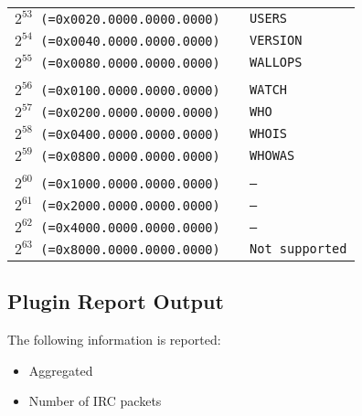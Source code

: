 \documentclass[documentation]{subfiles}
\begin{document}
\begin{minipage}{.48\textwidth}
\begin{longtable}{>{\tt}r>{\tt}l}
        $2^{53}$ (=0x0020.0000.0000.0000) & USERS        \\
        $2^{54}$ (=0x0040.0000.0000.0000) & VERSION      \\
        $2^{55}$ (=0x0080.0000.0000.0000) & WALLOPS      \\
        \\
        $2^{56}$ (=0x0100.0000.0000.0000) & WATCH        \\
        $2^{57}$ (=0x0200.0000.0000.0000) & WHO          \\
        $2^{58}$ (=0x0400.0000.0000.0000) & WHOIS        \\
        $2^{59}$ (=0x0800.0000.0000.0000) & WHOWAS       \\
        \\
        $2^{60}$ (=0x1000.0000.0000.0000) & --           \\
        $2^{61}$ (=0x2000.0000.0000.0000) & --           \\
        $2^{62}$ (=0x4000.0000.0000.0000) & --           \\
        $2^{63}$ (=0x8000.0000.0000.0000) & \textnormal{Not supported}\\
        \bottomrule
    \end{longtable}
\end{minipage}

\subsection{Plugin Report Output}
The following information is reported:
\begin{itemize}
    \item Aggregated {\tt{}}
    \item Number of IRC packets
\end{itemize}
\end{document}
